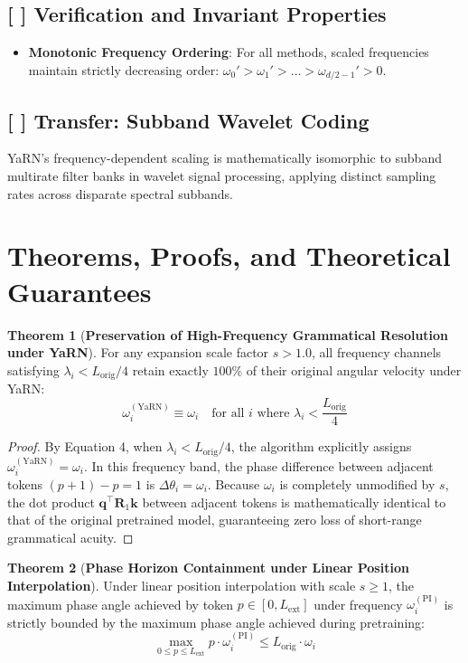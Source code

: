 \documentclass[11pt,a4paper]{article}
\theoremstyle{definition}
\newtheorem{theorem}{\textbf{Theorem}}[section]
\begin{document}
\subsection{[ ] Verification and Invariant Properties}
\begin{itemize}
    \item \textbf{Monotonic Frequency Ordering}: For all methods, scaled frequencies maintain strictly decreasing order: $\omega_0' > \omega_1' > \dots > \omega_{d/2-1}' > 0$.
\end{itemize}

\subsection{[ ] Transfer: Subband Wavelet Coding}
YaRN's frequency-dependent scaling is mathematically isomorphic to subband multirate filter banks in wavelet signal processing, applying distinct sampling rates across disparate spectral subbands.

\section{Theorems, Proofs, and Theoretical Guarantees}

\begin{theorem}[\textbf{Preservation of High-Frequency Grammatical Resolution under YaRN}]
For any expansion scale factor $s > 1.0$, all frequency channels satisfying $\lambda_i < L_{\text{orig}} / 4$ retain exactly $100\%$ of their original angular velocity under YaRN:
{\boldmath
\begin{equation}
\omega_i^{(\text{YaRN})} \equiv \omega_i \quad \text{for all } i \text{ where } \lambda_i < \frac{L_{\text{orig}}}{4}
\end{equation}
}
\end{theorem}

\begin{proof}
By Equation 4, when $\lambda_i < L_{\text{orig}}/4$, the algorithm explicitly assigns $\omega_i^{(\text{YaRN})} = \omega_i$.
In this frequency band, the phase difference between adjacent tokens $(p+1) - p = 1$ is $\Delta \theta_i = \omega_i$.
Because $\omega_i$ is completely unmodified by $s$, the dot product $\mathbf{q}^\top \mathbf{R}_1 \mathbf{k}$ between adjacent tokens is mathematically identical to that of the original pretrained model, guaranteeing zero loss of short-range grammatical acuity.
\end{proof}

\begin{theorem}[\textbf{Phase Horizon Containment under Linear Position Interpolation}]
Under linear position interpolation with scale $s \ge 1$, the maximum phase angle achieved by token $p \in [0, L_{\text{ext}}]$ under frequency $\omega_i^{(\text{PI})}$ is strictly bounded by the maximum phase angle achieved during pretraining:
{\boldmath
\begin{equation}
\max_{0 \le p \le L_{\text{ext}}} p \cdot \omega_i^{(\text{PI})} \le L_{\text{orig}} \cdot \omega_i
\end{equation}
}
\end{theorem}
\end{document}
